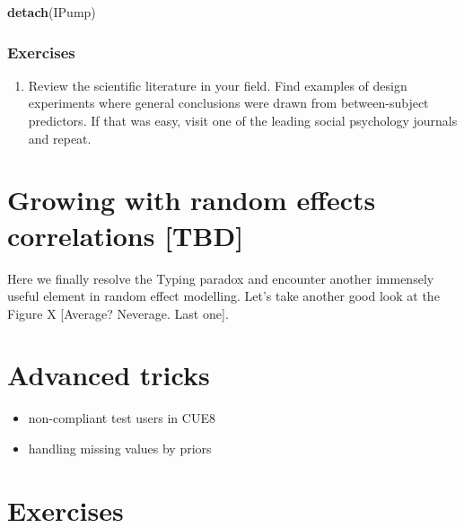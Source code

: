 \documentclass[]{svmono}
\newenvironment{Shaded}{\begin{snugshade}}{\end{snugshade}}
\newcommand{\KeywordTok}[1]{\textcolor[rgb]{0.13,0.29,0.53}{\textbf{#1}}}
\newcommand{\NormalTok}[1]{#1}
\providecommand{\tightlist}{%
  \setlength{\itemsep}{0pt}\setlength{\parskip}{0pt}}
\theoremstyle{definition}
\theoremstyle{definition}
\theoremstyle{definition}
\theoremstyle{remark}
\begin{document}
\begin{Shaded}
\begin{Highlighting}[]
\KeywordTok{detach}\NormalTok{(IPump)}
\end{Highlighting}
\end{Shaded}

\subsubsection{}\label{section}

\subsubsection{Exercises}\label{exercises-6}

\begin{enumerate}
\def\labelenumi{\arabic{enumi}.}
\tightlist
\item
  Review the scientific literature in your field. Find examples of
  design experiments where general conclusions were drawn from
  between-subject predictors. If that was easy, visit one of the leading
  social psychology journals and repeat.
\end{enumerate}

\section{Growing with random effects correlations
{[}TBD{]}}\label{re_correlations}

Here we finally resolve the Typing paradox and encounter another
immensely useful element in random effect modelling. Let's take another
good look at the Figure X {[}Average? Neverage. Last one{]}.

\section{Advanced tricks}\label{advanced-tricks}

\begin{itemize}
\tightlist
\item
  non-compliant test users in CUE8
\item
  handling missing values by priors
\end{itemize}

\section{Exercises}\label{exercises-7}
\end{document}

